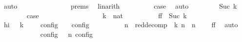 \begin{isabellebody}
\ auto\isanewline
\ \ \ \ \ \ \isamarkupfalse%
\ \isamarkupfalse%
\ {\isacartoucheopen}{\isasymS}\ {\isacharequal}\ {\isasymS}\ \isamarkupfalse%
\ {\isacharasterisk}\ {\isachardoublequoteopen}{}{\isachardot}prems{\isachardoublequoteclose}\ \isamarkupfalse%
\ linarith\isanewline
\ \ \ \ \ \ \isamarkupfalse%
\ \isamarkupfalse%
\ {\isacharquery}case\ \isamarkupfalse%
\ auto\isanewline
\ \ \isamarkupfalse%
\isanewline
\ \ \ \ \isamarkupfalse%
\ {\isacharparenleft}Suc\ k{\isacharparenright}\isanewline
\ \ \ \ \ \ \isamarkupfalse%
\ {\isacharquery}case\isanewline
\ \ \ \ \ \ \isamarkupfalse%
\ {\isacharminus}\isanewline
\ \ \ \ \ \ \ \ \isamarkupfalse%
\ k\ {\isacharcolon}{\isacharcolon}\ nat\isanewline
\ \ \ \ \ \ \ \ \isamarkupfalse%
\ ff{\isacharcolon}\ {\isacartoucheopen}{\isasymS}\ {\isasymhookrightarrow}\isactrlbsup Suc\ k\isactrlesup \ {\isasymS}\isanewline
\ \ \ \ \ \ \ \ \isamarkupfalse%
\ hi{\isacharcolon}\ {\isacartoucheopen}{\isasymAnd}{\isasymS}\ {\isasymS}\ {\isasymhookrightarrow}\isactrlbsup k\isactrlesup \ {\isasymS}\ {\isasymLongrightarrow}\ {\isasymlbrakk}\ {\isasymS}\ {\isasymrbrakk}\isactrlsub c\isactrlsub o\isactrlsub n\isactrlsub f\isactrlsub i\isactrlsub g\ {\isasymsubseteq}\ {\isasymlbrakk}\ {\isasymS}\ {\isasymrbrakk}\isactrlsub c\isactrlsub o\isactrlsub n\isactrlsub f\isactrlsub i\isactrlsub g{\isacartoucheclose}\isanewline
\ \ \ \ \ \ \ \ \isamarkupfalse%
\ {\isasymS}\isactrlsub n\ \ red{\isacharunderscore}decomp{\isacharcolon}\ {\isacartoucheopen}{\isacharparenleft}{\isasymS}\ {\isasymhookrightarrow}\isactrlbsup k\isactrlesup \ {\isasymS}\isactrlsub n{\isacharparenright}\ {\isasymand}\ {\isacharparenleft}{\isasymS}\isactrlsub n\ {\isasymhookrightarrow}\ {\isasymS}\ \isamarkupfalse%
\ ff\ \isamarkupfalse%
\ auto\isanewline
\ \ \ \ \ \ \ \ \isamarkupfalse%
\ {\isacartoucheopen}{\isasymlbrakk}\ {\isasymS}\ {\isasymrbrakk}\isactrlsub c\isactrlsub o\isactrlsub n\isactrlsub f\isactrlsub i\isactrlsub g\ {\isasymsupseteq}\ {\isasymlbrakk}\ {\isasymS}\isactrlsub n\ {\isasymrbrakk}\isactrlsub c\isactrlsub o\isactrlsub n\isactrlsub f\isactrlsub i\isactrlsub g{\isacartoucheclose}\ \isamarkupfalse%

\end{isabellebody}
